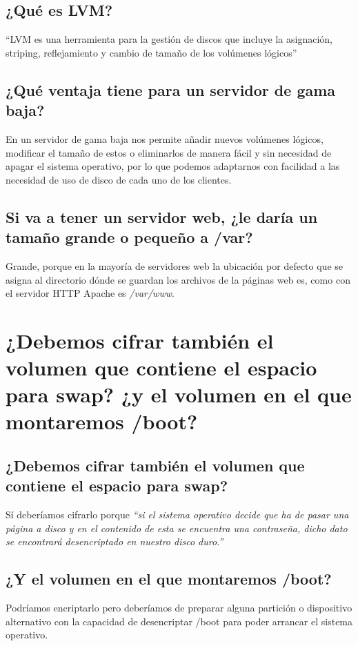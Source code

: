 \subsection{¿Qué es LVM?}
``LVM es una herramienta para la gestión de discos que incluye la asignación, striping, reflejamiento y cambio de tamaño de los volúmenes lógicos''\cite{c7a}
\subsection{¿Qué ventaja tiene para un servidor de gama baja?}
En un servidor de gama baja nos permite añadir nuevos volúmenes lógicos, modificar el tamaño de estos o eliminarlos de manera fácil y sin necesidad de apagar el sistema operativo, por lo que podemos adaptarnos con facilidad a las necesidad de uso de disco de cada uno de los clientes.\cite{c7b}
\subsection{Si va a tener un servidor web, ¿le daría un tamaño grande o pequeño a /var?}
Grande, porque en la mayoría de servidores web la ubicación por defecto que se asigna al directorio dónde se guardan los archivos de la páginas web es, como con el servidor HTTP Apache es \textit{/var/www}.
\section{¿Debemos cifrar también el volumen que contiene el espacio para swap? ¿y el volumen en el que montaremos /boot?}
 
\subsection{¿Debemos cifrar también el volumen que contiene el espacio para swap?}
Sí deberíamos cifrarlo porque \textit{``si el sistema operativo decide que ha de pasar una página a disco y en el contenido de esta se encuentra una contraseña, dicho dato se encontrará desencriptado en nuestro disco duro.''} \cite{c8a}

\subsection{¿Y el volumen en el que montaremos /boot?}
Podríamos encriptarlo pero deberíamos de preparar alguna partición o dispositivo alternativo con la capacidad de desencriptar /boot para poder arrancar el sistema operativo.

